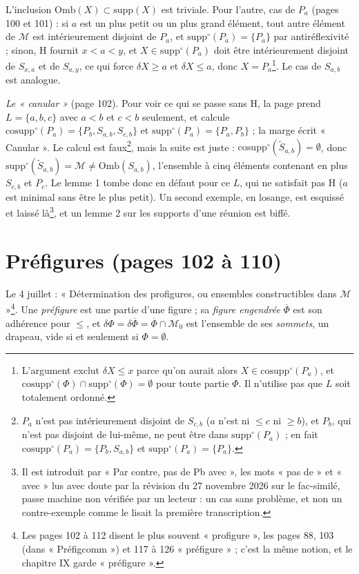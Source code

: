 \documentclass[11pt,a4paper]{article}
\begin{document}
L'inclusion $\mathrm{Omb}(X) \subset \mathrm{supp}(X)$ est triviale. Pour
l'autre, cas de $P_{a}$ (pages 100 et 101) : si $a$ est un plus petit ou un
plus grand élément, tout autre élément de $\mathcal{M}$ est intérieurement
disjoint de $P_{a}$, et $\mathrm{supp}^{\circ}(P_{a}) = \{P_{a}\}$ par
antiréflexivité ; sinon, H fournit $x < a < y$, et $X \in
\mathrm{supp}^{\circ}(P_{a})$ doit être intérieurement disjoint de $S_{x,a}$ et
de $S_{a,y}$, ce qui force $\delta X \geq a$ et $\delta X \leq a$, donc $X =
P_{a}$\footnote{L'argument exclut $\delta X \leq x$ parce qu'on aurait alors $X
\in \mathrm{cosupp}^{\circ}(P_{a})$, et $\mathrm{cosupp}^{\circ}(\Phi) \cap
\mathrm{supp}^{\circ}(\Phi) = \emptyset$ pour toute partie $\Phi$. Il n'utilise
pas que $L$ soit totalement ordonné.}. Le cas de $S_{a,b}$ est analogue.

\emph{Le « canular »} (page 102). Pour voir ce qui se passe sans H, la page
prend $L = \{a, b, c\}$ avec $a < b$ et $c < b$ seulement, et calcule
$\mathrm{cosupp}^{\circ}(P_{a}) = \{P_{b}, S_{a,b}, S_{c,b}\}$ et
$\mathrm{supp}^{\circ}(P_{a}) = \{P_{a}, P_{b}\}$ ; la marge écrit
« Canular ». Le calcul est faux\footnote{$P_{a}$ n'est pas intérieurement
disjoint de $S_{c,b}$ ($a$ n'est ni $\leq c$ ni $\geq b$), et $P_{b}$, qui n'est
pas disjoint de lui-même, ne peut être dans $\mathrm{supp}^{\circ}(P_{a})$ ; en
fait $\mathrm{cosupp}^{\circ}(P_{a}) = \{P_{b}, S_{a,b}\}$ et
$\mathrm{supp}^{\circ}(P_{a}) = \{P_{a}\}$.}, mais la suite est juste :
$\mathrm{cosupp}^{\circ}(\widetilde{S}_{a,b}) = \emptyset$, donc
$\mathrm{supp}^{\circ}(\widetilde{S}_{a,b}) = \mathcal{M} \neq
\mathrm{Omb}(S_{a,b})$, l'ensemble à cinq éléments contenant en plus $S_{c,b}$ et
$P_{c}$. Le lemme 1 tombe donc en défaut pour ce $L$, qui ne satisfait pas H
($a$ est minimal sans être le plus petit). Un second exemple, en losange, est
esquissé et laissé là\footnote{Il est introduit par « Par contre, pas de Pb
avec », les mots « pas de » et « avec » lus avec doute par la révision du 27
novembre 2026 sur le fac-similé, passe machine non vérifiée par un lecteur : un
cas sans problème, et non un contre-exemple comme le lisait la première
transcription.}, et un lemme 2 sur les supports d'une réunion est
biffé.

\section*{Préfigures (pages 102 à 110)}

Le 4 juillet : « Détermination des profigures, ou ensembles constructibles dans
$\mathcal{M}$ »\footnote{Les pages 102 à 112 disent le plus souvent
« profigure », les pages 88, 103 (dans « Préfigcomm ») et 117 à 126
« préfigure » ; c'est la même notion, et le chapitre IX garde « préfigure ».}.
Une \emph{préfigure} est une partie d'une figure ; sa \emph{figure engendrée}
$\overline{\Phi}$ est son adhérence pour $\leq$, et $\delta\Phi = \delta
\overline{\Phi} = \overline{\Phi} \cap \mathcal{M}_{0}$ est l'ensemble de ses
\emph{sommets}, un drapeau, vide si et seulement si $\Phi = \emptyset$.
\end{document}
